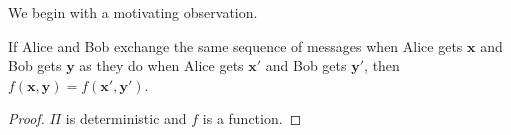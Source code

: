We begin with a motivating observation.
\pause
\begin{lemma}
If Alice and Bob exchange the same sequence of messages when Alice gets $\textbf{x}$ and Bob gets $\textbf{y}$ as they do when Alice gets $\textbf{x}'$ and Bob gets $\textbf{y}'$, then $f(\textbf{x}, \textbf{y}) = f(\textbf{x}', \textbf{y}')$.
\end{lemma}
\pause
\begin{proof}
$\Pi$ is deterministic and $f$ is a function.
\end{proof}

